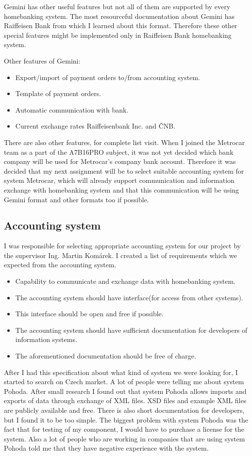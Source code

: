 \documentclass[11pt,twoside,a4paper]{book}
\begin{document}
Gemini has other useful features but not all of them are supported by every homebanking system. 
The most resourceful documentation about Gemini has Raiffeisen Bank\cite{rfb} from which I learned about this format.
Therefore these other special features might be implemented only in Raiffeisen Bank homebanking system. 

Other features of Gemini:
\begin{itemize}
	\item Export/import of payment orders to/from accounting system.
	\item Template of payment orders.
	\item Automatic communication with bank.
	\item Current exchange rates Raiffeisenbank Inc. and ČNB.
\end{itemize}
There are also other features, for complete list visit\cite{rfb}. When I joined the Metrocar team as a part of the A7B16PRO
subject, it was not yet decided which bank company will be used for Metrocar's company bank account. Therefore it was decided 
that my next assignment will be to select suitable accounting system for system Metrocar, which will already support communication and information exchange with homebanking system and that this communication will be using Gemini format and other formats too if possible. 

\subsection{Accounting system}
I was responsible for selecting appropriate accounting system for our project by the supervisor Ing. Martin Komárek. I created a list of requirements which we expected from the accounting system. 
\begin{itemize}
	\item Capability to communicate and exchange data with homebanking system.
	\item The accounting system should have interface(for access from other systems).
	\item This interface should be open and free if possible.
	\item The accounting system should have sufficient documentation for developers of information systems.
	\item The aforementioned documentation should be free of charge. 
\end{itemize}
After I had this specification about what kind of system we were looking for, I started to search on Czech market. 
A lot of people were telling me about system Pohoda\cite{pohoda}. After small research I found out that system Pohoda allows 
imports and exports of data through exchange of XML files\cite{xmlPohoda}. XSD files and example XML files are publicly available and free. There is also short documentation for developers, but I found it to be too simple. The biggest problem with system Pohoda was the fact that for testing of my component, I would have to purchase a license for the system. Also a lot of people who are working in companies that are using system Pohoda told me that they have negative experience with the system. 
\end{document}
